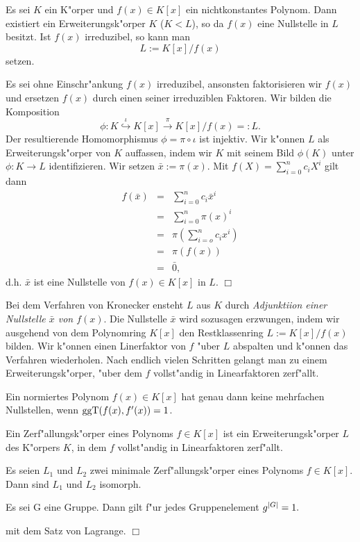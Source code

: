   \begin{satz}
    Es sei $K$ ein K"orper und $f(x)\in K[x]$ ein nichtkonstantes Polynom.
    Dann existiert ein Erweiterungsk"orper $K$ ($K<L$), so da\3 $f(x)$ eine
    Nullstelle in $L$ besitzt. Ist $f(x)$ irreduzibel, so kann man 
    $$ L:= K[x]/f(x) $$
    setzen.
  \end{satz}
  \beweis Es sei ohne Einschr"ankung $f(x)$ irreduzibel, ansonsten 
  faktorisieren wir $f(x)$ und ersetzen $f(x)$ durch einen 
  seiner irreduziblen Faktoren. Wir bilden die Komposition
  $$ \phi: K \stackrel{\iota}{\hookrightarrow} K[x] 
             \stackrel{\pi}{\rightarrow} K[x]/f(x) =:L. $$
  Der resultierende Homomorphismus $\phi = \pi \circ \iota$ ist injektiv.
  Wir k"onnen $L$ als Erweiterungsk"orper von $K$ auffassen, indem wir
  $K$ mit seinem Bild $\phi (K)$ unter $\phi: K \rightarrow L$
  identifizieren. Wir setzen $\bar{x} := \pi(x)$. Mit 
  $ f(X) = \sum_{i=0}^{n} c_i X^i$ gilt dann
  \begin{eqnarray*}
    f(\bar{x}) & = & \sum_{i=0}^{n} c_i \bar{x}^i \\
               & = & \sum_{i=0}^{n} \pi(x)^i \\
               & = & \pi\left( \sum_{i=o}^{n} c_i x^i\right) \\
               & = & \pi\left(f(x)\right) \\
               & = & \bar{0},
  \end{eqnarray*}
  d.h. $\bar{x}$ ist eine Nullstelle von $f(x)\in K[x]$ in $L$. 
  \hfill $\Box$

  Bei dem Verfahren von Kronecker ensteht $L$ aus $K$ durch
  {\em Adjunktiion einer Nullstelle $\bar{x}$ von $f(x)$}. Die Nullstelle
  $\bar{x}$ wird sozusagen erzwungen, indem wir ausgehend von dem 
  Polynomring $K[x]$ den Restklassenring $L:=K[x]/f(x)$ bilden. Wir
  k"onnen einen Linerfaktor von $f$ "uber $L$ abspalten und k"onnen das
  Verfahren wiederholen. Nach endlich vielen Schritten gelangt man zu einem
  Erweiterungsk"orper, "uber dem $f$ vollst"andig in Linearfaktoren
  zerf"allt.
  \begin{lemma}
    Ein normiertes Polynom $f(x)\in K[x]$ hat genau dann keine mehrfachen
    Nullstellen, wenn $\mbox{ggT} (f(x),f'(x))=1$.
  \end{lemma}

  \begin{definition}
    Ein Zerf"allungsk"orper eines Polynoms $f\in K[x]$ ist ein
    Erweiterungsk"orper $L$ des K"orpers $K$, in dem $f$ vollst"andig
    in Linearfaktoren zerf"allt.
  \end{definition}  
  \begin{satz}
    Es seien $L_1$ und $L_2$ zwei minimale Zerf"allungsk"orper eines
    Polynoms $f\in K[x]$. Dann sind $L_1$ und $L_2$ isomorph.
  \end{satz}
  \begin{lemma}[Gruppenordung]
    Es sei G eine Gruppe. Dann gilt f"ur jedes Gruppenelement 
    $ g^{\mid G \mid} = 1. $
  \end{lemma}
  \beweis mit dem Satz von Lagrange. \hfill $\Box$

